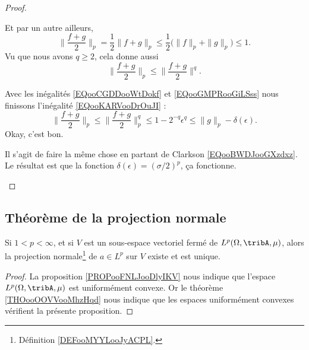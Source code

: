 \begin{proof}
\begin{subproof}
			Et par un autre ailleurs,
			\begin{equation}        \label{EQooOFWYooLVrNDc}
				\| \frac{ f+g }{2} \|_p=\frac{ 1 }{2}\| f+g \|_p\leq \frac{ 1 }{2}\big( \| f \|_p+\| g \|_p \big)\leq 1.
			\end{equation}
			Vu que nous avons \( q\geq 2\), cela donne aussi
			\begin{equation}        \label{EQooGMPRooGiLSss}
				\| \frac{ f+g }{2} \|_p\leq \| \frac{ f+g }{2} \|^q.
			\end{equation}

			Avec les inégalités \eqref{EQooCGDDooWtDokf} et \ref{EQooGMPRooGiLSss} nous finissons l'inégalité \eqref{EQooKARVooDrOuJI} :
			\begin{equation}
				\| \frac{ f+g }{2} \|_p\leq \| \frac{ f+g }{2} \|_p^q\leq 1-2^{-q}\epsilon^q\leq \| g \|_p-\delta(\epsilon).
			\end{equation}
			Okay, c'est bon.

			Il s'agit de faire la même chose en partant de Clarkson \eqref{EQooBWDJooGXzdxz}. Le résultat est que la fonction \( \delta(\epsilon)=(\sigma/2)^p\), ça fonctionne.
		\end{subproof}
	\end{proof}

	\subsection{Théorème de la projection normale}

	\begin{proposition}     \label{PROPooTZMRooCvQtGg}
		Si \( 1<p<\infty\), et si \( V\) est un sous-espace vectoriel fermé de \( L^p(\Omega,\tribA, \mu)\), alors la projection normale\footnote{Définition \ref{DEFooMYYLooJyACPL}.} de \( a\in L^p\) sur \( V\) existe et est unique.
	\end{proposition}

	\begin{proof}
		La proposition \ref{PROPooFNLJooDlyIKV} nous indique que l'espace \( L^p(\Omega,\tribA, \mu)\) est uniformément convexe. Or le théorème \ref{THOooOOVVooMhzHqd} nous indique que les espaces uniformément convexes vérifient la présente proposition.
	\end{proof}

